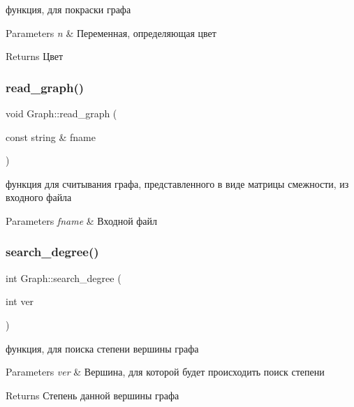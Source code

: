 функция, для покраски графа 


\begin{DoxyParams}{Parameters}
{\em n} & Переменная, определяющая цвет \\
\hline
\end{DoxyParams}
\begin{DoxyReturn}{Returns}
Цвет 
\end{DoxyReturn}
\mbox{\label{class_graph_a616456b0910e93422493040d35b06239}} 
\subsubsection{\texorpdfstring{read\+\_\+graph()}{read\_graph()}}
{\footnotesize\ttfamily void Graph\+::read\+\_\+graph (\begin{DoxyParamCaption}\item[{const string \&}]{fname }\end{DoxyParamCaption})}

функция для считывания графа, представленного в виде матрицы смежности, из входного файла 
\begin{DoxyParams}{Parameters}
{\em fname} & Входной файл \\
\hline
\end{DoxyParams}
\mbox{\label{class_graph_a15aa3f0cf781e6401b770386b3806bc2}} 
\subsubsection{\texorpdfstring{search\+\_\+degree()}{search\_degree()}}
{\footnotesize\ttfamily int Graph\+::search\+\_\+degree (\begin{DoxyParamCaption}\item[{int}]{ver }\end{DoxyParamCaption})}



функция, для поиска степени вершины графа 


\begin{DoxyParams}{Parameters}
{\em ver} & Вершина, для которой будет происходить поиск степени \\
\hline
\end{DoxyParams}
\begin{DoxyReturn}{Returns}
Степень данной вершины графа 
\end{DoxyReturn}
\mbox{\label{class_graph_a2ed0d56928f1a12a9aaada8e5d1cc77f}} 
